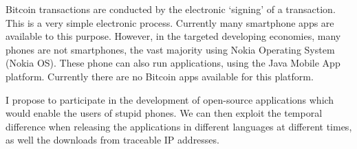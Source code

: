 \documentclass[a4paper]{report}
\begin{document}
\begin{refsection}
Bitcoin transactions are conducted by the electronic `signing' of a transaction.
This is a very simple electronic process.
Currently many smartphone apps are available to this purpose.
However, in the targeted developing economies, many phones are not smartphones, the vast majority using Nokia Operating System (Nokia OS).
 These phone can also run applications, using the Java Mobile App platform. Currently there are no Bitcoin apps available for this platform.

I propose to participate in the development of open-source applications which would enable the users of stupid phones.
We can then exploit the temporal difference when releasing the applications in different languages at different times,
as well the downloads from traceable IP addresses.

\printbibliography

\end{refsection}
\end{document}
